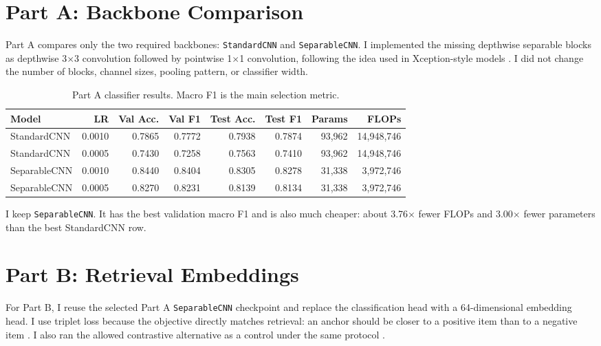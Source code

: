 \documentclass[11pt,a4paper]{article}
\newcommand{\model}[1]{\texttt{#1}}
\begin{document}
\section{Part A: Backbone Comparison}

Part A compares only the two required backbones: \model{StandardCNN} and \model{SeparableCNN}. I implemented the missing depthwise separable blocks as depthwise 3$\times$3 convolution followed by pointwise 1$\times$1 convolution, following the idea used in Xception-style models \cite{chollet2017xception}. I did not change the number of blocks, channel sizes, pooling pattern, or classifier width.

\begin{table}[H]
\centering
\footnotesize
\begin{tabular}{lrrrrrrr}
\toprule
\textbf{Model} & \textbf{LR} & \textbf{Val Acc.} & \textbf{Val F1} & \textbf{Test Acc.} & \textbf{Test F1} & \textbf{Params} & \textbf{FLOPs} \\
\midrule
StandardCNN & 0.0010 & 0.7865 & 0.7772 & 0.7938 & 0.7874 & 93,962 & 14,948,746 \\
StandardCNN & 0.0005 & 0.7430 & 0.7258 & 0.7563 & 0.7410 & 93,962 & 14,948,746 \\
SeparableCNN & 0.0010 & 0.8440 & 0.8404 & 0.8305 & 0.8278 & 31,338 & 3,972,746 \\
SeparableCNN & 0.0005 & 0.8270 & 0.8231 & 0.8139 & 0.8134 & 31,338 & 3,972,746 \\
\bottomrule
\end{tabular}
\caption{Part A classifier results. Macro F1 is the main selection metric.}
\label{tab:parta}
\end{table}

I keep \model{SeparableCNN}. It has the best validation macro F1 and is also much cheaper: about 3.76$\times$ fewer FLOPs and 3.00$\times$ fewer parameters than the best StandardCNN row.

\section{Part B: Retrieval Embeddings}

For Part B, I reuse the selected Part A \model{SeparableCNN} checkpoint and replace the classification head with a 64-dimensional embedding head. I use triplet loss because the objective directly matches retrieval: an anchor should be closer to a positive item than to a negative item \cite{schroff2015facenet}. I also ran the allowed contrastive alternative as a control under the same protocol \cite{hadsell2006dimensionality}.
\end{document}
